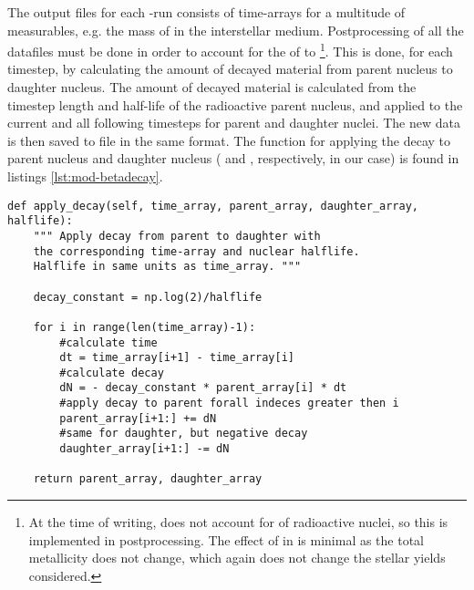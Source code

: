 \label{sec:mod-betadecay}
The output files for each \omegamodel-run consists of time-arrays for a multitude of measurables, e.g. the mass of  in the interstellar medium.
Postprocessing of all the datafiles must be done in order to account for the \betadecay of  to \footnote{At the time of writing, \omegamodel does not account for \betadecay of radioactive nuclei, so this is implemented in postprocessing. The effect of \betadecay in \omegamodel is minimal as the total metallicity does not change, which again does not change the stellar yields considered.}.
This is done, for each timestep, by calculating the amount of decayed material from parent nucleus to daughter nucleus. The amount of decayed material is calculated from the timestep length and half-life of the radioactive parent nucleus, and applied to the current and all following timesteps for parent and daughter nuclei.
The new data is then saved to file in the same format.
The function for applying the decay to parent nucleus and daughter nucleus ( and , respectively, in our case) is found in listings \ref{lst:mod-betadecay}.

\begin{lstlisting}[style=custompython, caption={\label{lst:mod-betadecay}Snippet of code implementing \betadecay in postprocessing on data calculated by \omegamodel.}]
def apply_decay(self, time_array, parent_array, daughter_array, halflife):
    """ Apply decay from parent to daughter with 
    the corresponding time-array and nuclear halflife.
    Halflife in same units as time_array. """

    decay_constant = np.log(2)/halflife

    for i in range(len(time_array)-1):
        #calculate time
        dt = time_array[i+1] - time_array[i]
        #calculate decay
        dN = - decay_constant * parent_array[i] * dt
        #apply decay to parent forall indeces greater then i
        parent_array[i+1:] += dN
        #same for daughter, but negative decay
        daughter_array[i+1:] -= dN

    return parent_array, daughter_array
\end{lstlisting}
